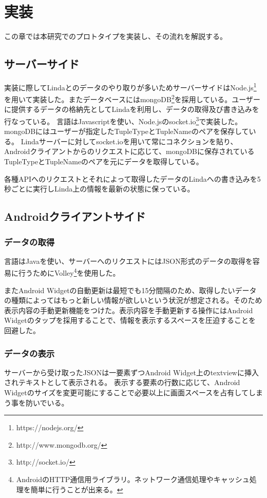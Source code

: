 \chapter{実装}
\label{chap:prototype}

この章では本研究でのプロトタイプを実装し、その流れを解説する。

\section{サーバーサイド}
実装に際してLindaとのデータのやり取りが多いためサーバーサイドはNode.js\footnote{https://nodejs.org/}を用いて実装した。またデータベースにはmongoDB\footnote{http://www.mongodb.org/}を採用している。ユーザーに提供するデータの格納先としてLindaを利用し、データの取得及び書き込みを行なっている。
言語はJavascriptを使い、Node.jsのsocket.io\footnote{http://socket.io/}で実装した。
mongoDBにはユーザーが指定したTupleTypeとTupleNameのペアを保存している。
Lindaサーバーに対してsocket.ioを用いて常にコネクションを貼り、Androidクライアントからのリクエストに応じて、mongoDBに保存されているTupleTypeとTupleNameのペアを元にデータを取得している。

各種APIへのリクエストとそれによって取得したデータのLindaへの書き込みを5秒ごとに実行しLinda上の情報を最新の状態に保っている。

\section{Androidクライアントサイド}
\subsection{データの取得}
言語はJavaを使い、サーバーへのリクエストにはJSON形式のデータの取得を容易に行うためにVolley\footnote{AndroidのHTTP通信用ライブラリ。ネットワーク通信処理やキャッシュ処理を簡単に行うことが出来る。}を使用した。

またAndroid Widgetの自動更新は最短でも15分間隔のため、取得したいデータの種類によってはもっと新しい情報が欲しいという状況が想定される。そのため表示内容の手動更新機能をつけた。表示内容を手動更新する操作にはAndroid Widgetのタップを採用することで、情報を表示するスペースを圧迫することを回避した。

\subsection{データの表示}
サーバーから受け取ったJSONは一要素ずつAndroid Widget上のtextviewに挿入されテキストとして表示される。
表示する要素の行数に応じて、Android Widgetのサイズを変更可能にすることで必要以上に画面スペースを占有してしまう事を防いでいる。

